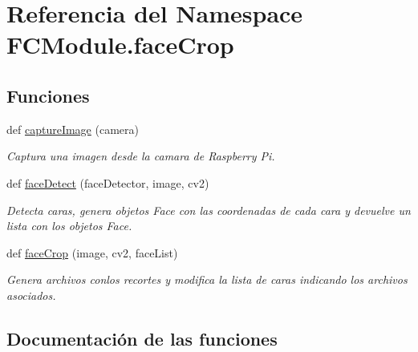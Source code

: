 \hypertarget{namespace_f_c_module_1_1face_crop}{}\section{Referencia del Namespace F\+C\+Module.\+face\+Crop}
\label{namespace_f_c_module_1_1face_crop}
\subsection*{Funciones}
\begin{DoxyCompactItemize}
\item 
def \mbox{\hyperlink{namespace_f_c_module_1_1face_crop_a9bf6ee5d5b014b164481d2b04e342176}{capture\+Image}} (camera)
\begin{DoxyCompactList}\small\item\em Captura una imagen desde la camara de Raspberry Pi. \end{DoxyCompactList}\item 
def \mbox{\hyperlink{namespace_f_c_module_1_1face_crop_a8ea1491e88b53ba928c36fea4fab8f50}{face\+Detect}} (face\+Detector, image, cv2)
\begin{DoxyCompactList}\small\item\em Detecta caras, genera objetos Face con las coordenadas de cada cara y devuelve un lista con los objetos Face. \end{DoxyCompactList}\item 
def \mbox{\hyperlink{namespace_f_c_module_1_1face_crop_a228a8265b22b6f5b14306893fb8df335}{face\+Crop}} (image, cv2, face\+List)
\begin{DoxyCompactList}\small\item\em Genera archivos conlos recortes y modifica la lista de caras indicando los archivos asociados. \end{DoxyCompactList}\end{DoxyCompactItemize}


\subsection{Documentación de las funciones}
\mbox{\label{namespace_f_c_module_1_1face_crop_a9bf6ee5d5b014b164481d2b04e342176}} 
